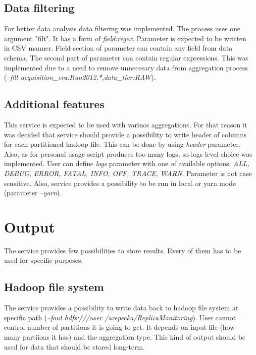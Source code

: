 \subsection{Data filtering}

For better data analysis data filtering was implemented. The process uses one argument "filt". It has a form of \textit{field:regex}. Parameter is expected to be written 
in CSV manner. Field section of parameter can contain any field from data schema. The second part of parameter can contain regular expressions. This was implemented 
due to a need to remove unnecesary data from aggregation process (\textit{--filt acquisition{\_}era:Run2012.*,data{\_}tier:RAW}).

\subsection{Additional features}

This service is expected to be used with variuos aggregations. For that reason it was decided that service should provide a possibility to write header of columns for 
each partitioned hadoop file. This can be done by using \textit{header} parameter. Also, as for personal usage script produces too many logs, so logs level choice was 
implemented. User can define \textit{logs} parameter with one of available options: 
\textit{ALL, DEBUG, ERROR, FATAL, INFO, OFF, TRACE, WARN}. Parameter is not case sensitive. Also, service provides a possibility to be run in local or yarn mode (parameter 
\textit{--yarn}).

\section{Output}

The service provides few possibilities to store results. Every of them has to be used for specific purposes.

\subsection{Hadoop file system}

The service provides a possibility to write data back to hadoop file system at specific path (\textit{--fout hdfs:///user /arepecka/ReplicaMonitoring}). User cannot 
control number of partitions it is going to get. It depends on input file (how many partiions it has) and the aggregation type. This kind of output should be used 
for data that should be stored long-term.

